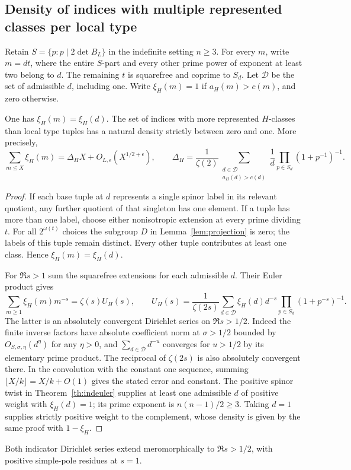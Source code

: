 \subsection{Density of indices with multiple represented classes per local type}
Retain \(S=\{p:p\mid 2\det B_L\}\) in the indefinite setting \(n\ge3\).
For every \(m\), write \(m=dt\), where the entire \(S\)-part and every other prime power of exponent at least two belong to \(d\). The remaining \(t\) is squarefree and coprime to \(S_d\). Let \(\mathcal D\) be the set of admissible \(d\), including one. Write \(\xi_H(m)=1\) if \(a_H(m)>c(m)\), and zero otherwise.

\begin{theorem}\label{th:densityind}
One has \(\xi_H(m)=\xi_H(d)\). The set of indices with more represented \(H\)-classes than local type tuples has a natural density strictly between zero and one. More precisely,
\[
 \sum_{m\le X}\xi_H(m)=\Delta_H X+O_{L,\epsilon}(X^{1/2+\epsilon}),\qquad
 \Delta_H=\frac{1}{\zeta(2)}
 \sum_{\substack{d\in\mathcal D\\a_H(d)>c(d)}}\frac1d
                 \prod_{p\in S_d}(1+p^{-1})^{-1}.
\]
\end{theorem}
\begin{proof}
If each base tuple at \(d\) represents a single spinor label in its relevant quotient, any further quotient of that singleton has one element. If a tuple has more than one label, choose either nonisotropic extension at every prime dividing \(t\). For all \(2^{\omega(t)}\) choices the subgroup \(D\) in Lemma~\ref{lem:projection} is zero; the labels of this tuple remain distinct. Every other tuple contributes at least one class. Hence $\xi_H(m)=\xi_H(d)$.

For \(\Re s>1\) sum the squarefree extensions for each admissible \(d\). Their Euler product gives
\[
 \sum_{m\ge1}\xi_H(m)m^{-s}=\zeta(s) U_H(s),\qquad
 U_H(s)=\frac1{\zeta(2s)}\sum_{d\in\mathcal D}\xi_H(d)d^{-s}
                 \prod_{p\in S_d}(1+p^{-s})^{-1}.
\]
The latter is an absolutely convergent Dirichlet series on \(\Re s>1/2\). Indeed the finite inverse factors have absolute coefficient norm at \(\sigma>1/2\) bounded by \(O_{S,\sigma,\eta}(d^\eta)\) for any \(\eta>0\), and \(\sum_{d\in\mathcal D}d^{-u}\) converges for \(u>1/2\) by its elementary prime product. The reciprocal of \(\zeta(2s)\) is also absolutely convergent there. In the convolution with the constant one sequence, summing \(\lfloor X/k\rfloor=X/k+O(1)\) gives the stated error and constant. The positive spinor twist in Theorem~\ref{th:indeuler} supplies at least one admissible \(d\) of positive weight with \(\xi_H(d)=1\); its prime exponent is \(n(n-1)/2\ge3\). Taking \(d=1\) supplies strictly positive weight to the complement, whose density is given by the same proof with \(1-\xi_H\).
\end{proof}
\begin{remark}
Both indicator Dirichlet series extend meromorphically to
$\Re s>1/2$, with positive simple-pole residues at $s=1$.
\end{remark}

